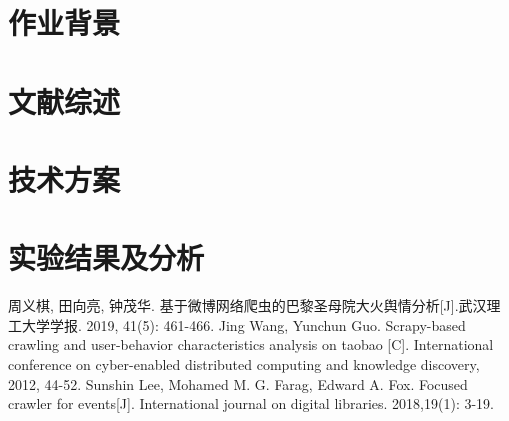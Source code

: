 \documentclass{homework-thesis}
\begin{document}
    \makecover
    \section{作业背景}
    \section{文献综述}
    \section{技术方案}
    \section{实验结果及分析}
    \begin{thebibliography}{99} %
         周义棋, 田向亮, 钟茂华. 基于微博网络爬虫的巴黎圣母院大火舆情分析[J].武汉理工大学学报. 2019, 41(5): 461-466.
         Jing Wang, Yunchun Guo. Scrapy-based crawling and user-behavior characteristics analysis on taobao [C]. International conference on cyber-enabled distributed computing and knowledge discovery, 2012, 44-52.
         Sunshin Lee, Mohamed M. G. Farag, Edward A. Fox. Focused crawler for events[J]. International journal on digital libraries. 2018,19(1): 3-19.
    \end{thebibliography}
\end{document}

